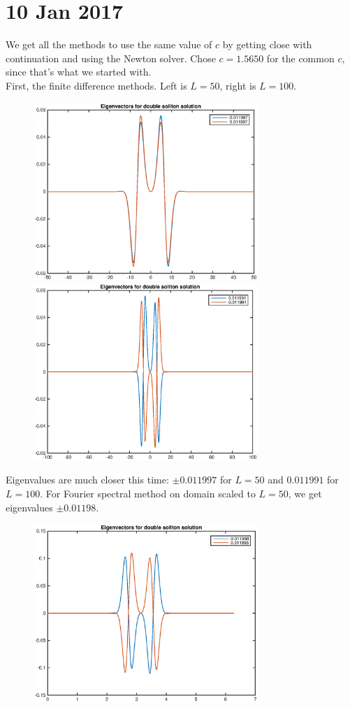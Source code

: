 \documentclass[12pt]{article}
\begin{document}
\section*{10 Jan 2017}

We get all the methods to use the same value of $c$ by getting close with continuation and using the Newton solver. Chose $c = 1.5650$ for the common $c$, since that's what we started with.\\

First, the finite difference methods. Left is $L = 50$, right is $L = 100$.

	\begin{figure}[H]
	\includegraphics[width=8.5cm]{double1_FD50_vec.eps}
	\includegraphics[width=8.5cm]{double1_FD100_vec.eps}
	\end{figure}

Eigenvalues are much closer this time: $\pm 0.011997$ for $L = 50$ and $0.011991$ for $L = 100$. For Fourier spectral method on domain scaled to $L = 50$, we get eigenvalues $\pm 0.01198$.

	\begin{figure}[H]
	\includegraphics[width=8.5cm]{double1_Four50_vec.eps}
	\end{figure}
\end{document}
